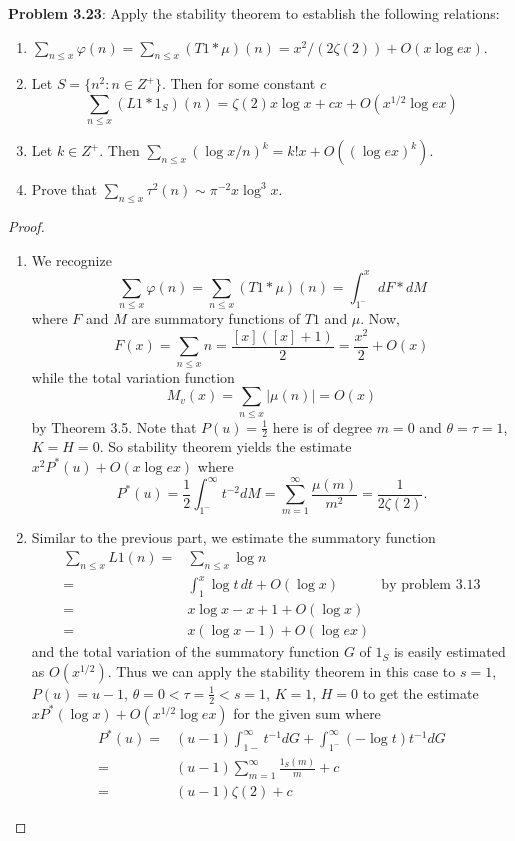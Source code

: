 \documentclass[12pt]{article}
\begin{document}
\fi

\textbf{Problem 3.23}: Apply the stability theorem to establish the following relations:
\begin{enumerate}
\item $\sum_{n \leq x} \varphi(n) = \sum_{n \leq x} (T1 * \mu)(n) = x^2 / (2 \zeta(2)) + O(x \log ex)$.
\item Let $S = \{n^2 : n \in Z^+\}$. Then for some constant $c$
$$\sum_{n \leq x} (L1 * 1_S)(n) = \zeta(2) x \log x + c x + O(x^{1/2} \log ex)$$
\item Let $k \in Z^+$. Then $\sum_{n \leq x} (\log x/n)^k = k! x + O((\log ex)^k)$.
\item Prove that $\sum_{n \leq x} \tau^2(n) \sim \pi^{-2} x \log^3 x$.
\end{enumerate}

\begin{proof}
\begin{enumerate}
\item We recognize
$$\sum_{n \leq x} \varphi(n) = \sum_{n \leq x} (T1 * \mu)(n) = \int_{1^-}^x dF * dM$$
where $F$ and $M$ are summatory functions of $T1$ and $\mu$. Now,
$$F(x) = \sum_{n \leq x} n = \frac{[x]([x] + 1)}{2} = \frac{x^2}{2} + O(x)$$
while the total variation function
$$M_v(x) = \sum_{n \leq x} |\mu(n)| = O(x)$$
by Theorem 3.5. Note that $P(u) = \frac{1}{2}$ here is of degree $m = 0$ and $\theta = \tau = 1$, $K = H = 0$. So stability theorem yields the estimate $x^2 P^*(u) + O(x \log ex)$ where
$$P^*(u) = \frac12 \int_{1^-}^{\infty} t^{-2} dM = \sum_{m = 1}^{\infty} \frac{\mu(m)}{m^2} = \frac{1}{2\zeta(2)}.$$

\item Similar to the previous part, we estimate the summatory function
\begin{align*}
\sum_{n \leq x} L1(n) =& \sum_{n \leq x} \log n\\
=& \int_1^x \log t \, dt + O(\log x) &\text{by problem 3.13}\\
=& x \log x - x + 1 + O(\log x)\\
=& x (\log x - 1) + O(\log ex)
\end{align*}
and the total variation of the summatory function $G$ of $1_S$ is easily estimated as $O(x^{1/2})$. Thus we can apply the stability theorem in this case to $s = 1$, $P(u) = u - 1$, $\theta = 0 < \tau = \frac 12 < s = 1$, $K = 1$, $H = 0$ to get the estimate $x P^*(\log x) + O(x^{1/2} \log ex)$ for the given sum where
\begin{align*}
P^*(u) =& (u - 1)\int_{1-}^{\infty} t^{-1} dG + \int_{1^-}^\infty (-\log t) t^{-1} dG\\
=& (u - 1) \sum_{m = 1}^{\infty} \frac{1_S(m)}{m} + c\\
=& (u - 1) \zeta(2) + c
\end{align*}


\end{enumerate}
\end{proof}
\end{document}
